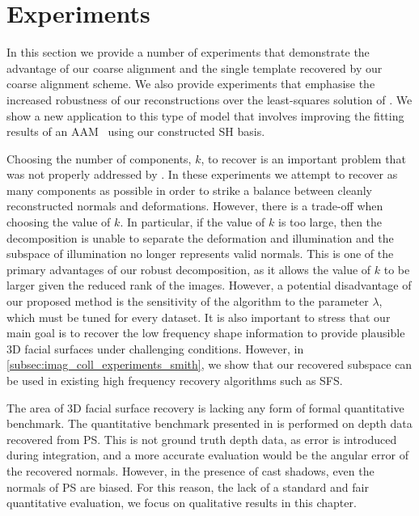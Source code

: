 \section{Experiments}\label{sec:imag_coll_experiments}
In this section we provide a number of experiments that demonstrate the
advantage of our coarse alignment and the single template recovered by our
coarse alignment scheme. We also provide experiments that emphasise the increased
robustness of our reconstructions over the least-squares solution of
\citet{KemelmacherShlizerman:2013iv}. We show a new application to this type
of model that involves improving the fitting results of an
AAM~\cite{cootes2001active} using our
constructed SH basis.

Choosing the number of components, $k$, to recover is an
important problem that was not properly addressed by \citet{KemelmacherShlizerman:2013iv}.
In these experiments we attempt to recover as many
components as possible in order to strike a balance between cleanly
reconstructed normals and deformations. However, there is a trade-off when choosing
the value of $k$. In particular, if the value of $k$ is too large, then the
decomposition is unable to separate the deformation and illumination and the subspace of
illumination no longer represents valid normals. This is one of the primary advantages
of our robust decomposition, as it allows the value of $k$ to be larger given
the reduced rank of the images. However, a potential disadvantage of our
proposed method is the sensitivity of the algorithm to the parameter $\lambda$,
which must be tuned for every dataset. It is also important to stress that our
main goal is to recover the low frequency shape information to provide plausible
3D facial surfaces under challenging conditions. However, in
\cref{subsec:imag_coll_experiments_smith}, we show that our recovered subspace can
be used in existing high frequency recovery algorithms such as SFS.\@

The area of 3D facial surface recovery is lacking any form of formal
quantitative benchmark. The quantitative benchmark presented in
\cite{KemelmacherShlizerman:2013iv} is performed on depth data recovered from PS.\@
This is not ground truth depth data, as error is introduced during
integration, and a more accurate evaluation would be the angular error of the
recovered normals. However, in the presence of cast shadows, even the normals of
PS are biased. For this reason, the lack of a standard and fair
quantitative evaluation, we focus on qualitative results in this chapter.

